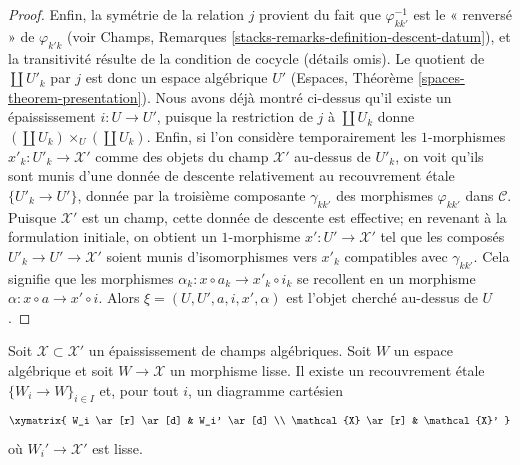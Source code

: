 \begin{proof}
Enfin, la symétrie de la relation $j$ provient du fait que
$\varphi_{kk'}^{-1}$ est le « renversé » de $\varphi_{k'k}$ (voir
Champs, Remarques \ref{stacks-remarks-definition-descent-datum}),
et la transitivité résulte de la condition de cocycle (détails omis).
Le quotient de $\coprod U'_k$ par $j$ est donc un espace algébrique $U'$
(Espaces, Théorème \ref{spaces-theorem-presentation}).
Nous avons déjà montré ci-dessus qu'il existe un épaississement
$i : U \to U'$, puisque la restriction de $j$ à
$\coprod U_k$ donne $(\coprod U_k) \times_U (\coprod U_k)$.
Enfin, si l'on considère temporairement les $1$-morphismes
$x'_k : U'_k \to \mathcal{X}'$ comme des objets du champ
$\mathcal{X}'$ au-dessus de $U'_k$, on voit qu'ils sont munis d'une
donnée de descente relativement au recouvrement \'etale
$\{U'_k \to U'\}$, donnée par la troisième composante $\gamma_{kk'}$
des morphismes $\varphi_{kk'}$ dans $\mathcal{C}$.
Puisque $\mathcal{X}'$ est un champ,
cette donnée de descente est effective; en revenant à la formulation initiale, on obtient
un $1$-morphisme $x' : U' \to \mathcal{X}'$ tel que les composés
$U'_k \to U' \to \mathcal{X}'$ soient munis d'isomorphismes vers $x'_k$
compatibles avec $\gamma_{kk'}$. Cela signifie que les morphismes
$\alpha_k : x \circ a_k \to x'_k \circ i_k$ se recollent en un morphisme
$\alpha : x \circ a \to x' \circ i$. Alors $\xi = (U, U', a, i, x', \alpha)$
est l'objet cherché au-dessus de $U$.
\end{proof}

\begin{lemma}
\label{lemma-etale-local-lifts}
Soit $\mathcal{X} \subset \mathcal{X}'$ un épaississement de champs algébriques.
Soit $W$ un espace algébrique et soit $W \to \mathcal{X}$ un morphisme lisse.
Il existe un recouvrement \'etale $\{W_i \to W\}_{i \in I}$ et, pour tout $i$,
un diagramme cartésien
$$
\xymatrix{
W_i \ar[r] \ar[d] & W_i' \ar[d] \\
\mathcal{X} \ar[r] & \mathcal{X}'
}
$$
où $W_i' \to \mathcal{X}'$ est lisse.
\end{lemma}

